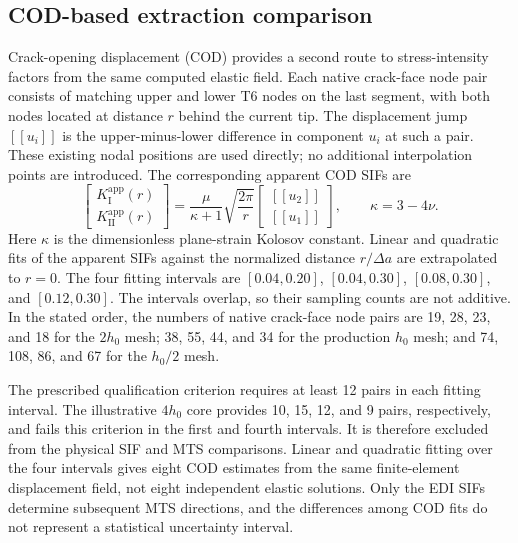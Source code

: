 \documentclass[pdflatex,sn-mathphys-num]{sn-jnl}
\begin{document}
\subsection{COD-based extraction comparison}
\label{sec:cod-extraction}
Crack-opening displacement (COD) provides a second route to
stress-intensity factors from the same computed elastic field.
Each native crack-face node pair consists of matching upper and
lower T6 nodes on the last segment, with both nodes located at
distance $r$ behind the current tip. The displacement jump
$[\![u_i]\!]$ is the upper-minus-lower difference in component
$u_i$ at such a pair. These existing nodal positions are used
directly; no additional interpolation points are introduced.
The corresponding apparent COD SIFs are
\begin{equation}
 \begin{bmatrix}K_{\mathrm{I}}^{\mathrm{app}}(r)\\K_{\mathrm{II}}^{\mathrm{app}}(r)\end{bmatrix}
 =\frac{\mu}{\kappa+1}\sqrt{\frac{2\pi}{r}}
 \begin{bmatrix}{[\![u_2]\!]}\\{[\![u_1]\!]}\end{bmatrix},
 \qquad \kappa=3-4\nu.\label{eq:cod}
\end{equation}
Here $\kappa$ is the dimensionless plane-strain Kolosov constant.
Linear and quadratic fits of the apparent SIFs against the normalized
distance $r/\Delta a$ are extrapolated to $r=0$. The four fitting
intervals are $[0.04,0.20]$, $[0.04,0.30]$, $[0.08,0.30]$, and
$[0.12,0.30]$. The intervals overlap, so their sampling counts are
not additive. In the stated order, the numbers of native crack-face
node pairs are 19, 28, 23, and 18 for the $2h_0$ mesh;
38, 55, 44, and 34 for the production $h_0$ mesh; and
74, 108, 86, and 67 for the $h_0/2$ mesh.

The prescribed qualification criterion requires at least 12 pairs
in each fitting interval. The illustrative $4h_0$ core provides
10, 15, 12, and 9 pairs, respectively, and fails this criterion
in the first and fourth intervals. It is therefore excluded from
the physical SIF and MTS comparisons. Linear and quadratic fitting
over the four intervals gives eight COD estimates from the same
finite-element displacement field, not eight independent elastic
solutions. Only the EDI SIFs determine subsequent MTS directions,
and the differences among COD fits do not represent a statistical
uncertainty interval.
\end{document}
